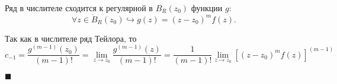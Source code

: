 \documentclass[12pt, a4paper, reqno]{article}
\begin{document}
    Ряд в числителе сходится к регулярной в $B_R(z_0)$ функции $g$:
    \begin{equation*}
        \forall z \in \mathring B_R(z_0) \hookrightarrow g(z) = (z - z_0)^m f(z).
    \end{equation*}

    Так как в числителе ряд Тейлора, то
    \begin{equation*}
        c_{-1} = \frac{g^{(m - 1)}(z_0)}{(m - 1)!} =
        \lim\limits_{z \to z_0} \frac{g^{(m - 1)}(z)}{(m - 1)!} =
        \frac{1}{(m - 1)!}\lim\limits_{z \to z_0} [(z - z_0)^m f(z)]^{(m - 1)}
    \end{equation*}

    $\blacksquare$

    \printbibliography[heading=bibintoc, title={Список литературы}]
\end{document}
